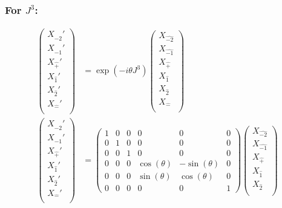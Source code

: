 \documentclass[]{article}
\numberwithin{equation}{section}
\begin{document}
{{\subsubsection{For $J^{3}$:}
\begin{align}
\begin{pmatrix}
    {X}_{\hat{-2}}'\\
    {X}_{\hat{-1}}'\\
    {X}_{\hat{+}}'\\
    {X}_{\hat{1}}'\\
    {X}_{\hat{2}}'\\
    {X}_{\hat{-}}'\\
    \end{pmatrix}&= \exp{(-i\theta J^{3})}\begin{pmatrix}
    {X}_{\hat{-2}}\\
    {X}_{\hat{-1}}\\
    {X}_{\hat{+}}\\
    {X}_{\hat{1}}\\
    {X}_{\hat{2}}\\
    {X}_{\hat{-}}\\
    \end{pmatrix}\\
    \begin{pmatrix}
    {X}_{\hat{-2}}'\\
    {X}_{\hat{-1}}'\\
    {X}_{\hat{+}}'\\
    {X}_{\hat{1}}'\\
    {X}_{\hat{2}}'\\
    {X}_{\hat{-}}'\\
    \end{pmatrix}&= \begin{pmatrix}
        1&0&0&0&0&0\\
        0&1&0&0&0&0\\
        0&0&1&0&0&0\\
        0&0&0&\cos{(\theta)}&-\sin{(\theta)}&0\\
        0&0&0&\sin{(\theta)}&\cos{(\theta)}&0\\
        0&0&0&0&0&1
    \end{pmatrix}\begin{pmatrix}
    {X}_{\hat{-2}}\\
    {X}_{\hat{-1}}\\
    {X}_{\hat{+}}\\
    {X}_{\hat{1}}\\
    {X}_{\hat{2}}\\

\end{pmatrix}
\end{align}}}
\end{document}
